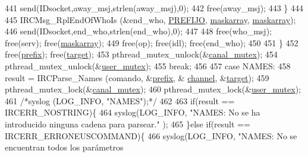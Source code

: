 \begin{DoxyCode}
{{{{{{441                                         send(IDsocket,away\_msj,strlen(away\_msj),0);
442                                         free(away\_msj);
443                                 \}
444 
445                                 IRCMsg\_RplEndOfWhoIs (&end\_who, \hyperlink{_g-2361-06-_p1-_server_8h_a78c658ff923693099f7b621e7c351129}{PREFIJO}, 
      \hyperlink{_g-2361-06-_p1-_server_8c_ad51a4303b7c769561b12bf04a68bc042}{maskarray}, \hyperlink{_g-2361-06-_p1-_server_8c_ad51a4303b7c769561b12bf04a68bc042}{maskarray});
446                                 send(IDsocket,end\_who,strlen(end\_who),0);
447 
448                                 free(who\_msj); free(serv); free(\hyperlink{_g-2361-06-_p1-_server_8c_ad51a4303b7c769561b12bf04a68bc042}{maskarray});
449                                 free(op); free(idl); free(end\_who);
450                                 
451                         \}
452                         free(\hyperlink{_g-2361-06-_p1-_server_8c_ad2849cf781a4db22cc1b31eaaee50a4f}{prefix}); free(\hyperlink{_g-2361-06-_p1-_server_8c_a23b26cdb3a71f525caf03b57f68d47fa}{target}); 
453                         pthread\_mutex\_unlock(&\hyperlink{_g-2361-06-_p1-_server_8c_ab86a544a49de18195048bac54dd3ac3e}{canal\_mutex});
454                         pthread\_mutex\_unlock(&\hyperlink{_g-2361-06-_p1-_server_8c_a5dedd07a1144d2ab70b74a8e64b6a7c0}{user\_mutex});
455                         \textcolor{keywordflow}{break};
456 
457                 \textcolor{keywordflow}{case} NAMES:
458                         result = IRCParse\_Names (comando, &\hyperlink{_g-2361-06-_p1-_server_8c_ad2849cf781a4db22cc1b31eaaee50a4f}{prefix}, &
      \hyperlink{_g-2361-06-_p1-_server_8c_a842ca2f026578e5c479c095ff3335969}{channel}, &\hyperlink{_g-2361-06-_p1-_server_8c_a23b26cdb3a71f525caf03b57f68d47fa}{target});
459                 pthread\_mutex\_lock(&\hyperlink{_g-2361-06-_p1-_server_8c_ab86a544a49de18195048bac54dd3ac3e}{canal\_mutex});
460                         pthread\_mutex\_lock(&\hyperlink{_g-2361-06-_p1-_server_8c_a5dedd07a1144d2ab70b74a8e64b6a7c0}{user\_mutex});
461                \textcolor{comment}{/*syslog (LOG\_INFO, "NAMES");*/}
462 
463                 \textcolor{keywordflow}{if}(result == IRCERR\_NOSTRING)\{
464                                 syslog(LOG\_INFO, \textcolor{stringliteral}{"NAMES: No se ha introducido ninguna cadena para parsear."}
      );
465                         \}\textcolor{keywordflow}{else} \textcolor{keywordflow}{if}(result == IRCERR\_ERRONEUSCOMMAND)\{
466                                 syslog(LOG\_INFO, \textcolor{stringliteral}{"NAMES: No se encuentran todos los parámetros
}}}}}}}
\end{DoxyCode}
